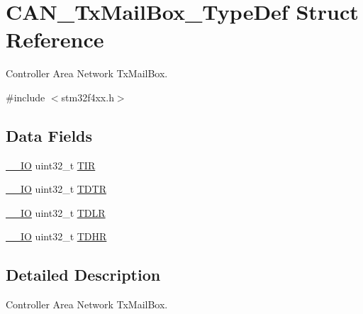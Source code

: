 \hypertarget{struct_c_a_n___tx_mail_box___type_def}{\section{C\-A\-N\-\_\-\-Tx\-Mail\-Box\-\_\-\-Type\-Def Struct Reference}
\label{struct_c_a_n___tx_mail_box___type_def}
}


Controller Area Network Tx\-Mail\-Box.  




{\ttfamily \#include $<$stm32f4xx.\-h$>$}

\subsection*{Data Fields}
\begin{DoxyCompactItemize}
\item 
\hyperlink{group___c_m_s_i_s__core__definitions_gaec43007d9998a0a0e01faede4133d6be}{\-\_\-\-\_\-\-I\-O} uint32\-\_\-t \hyperlink{struct_c_a_n___tx_mail_box___type_def_a6921aa1c578a7d17c6e0eb33a73b6630}{T\-I\-R}
\item 
\hyperlink{group___c_m_s_i_s__core__definitions_gaec43007d9998a0a0e01faede4133d6be}{\-\_\-\-\_\-\-I\-O} uint32\-\_\-t \hyperlink{struct_c_a_n___tx_mail_box___type_def_aed87bed042dd9523ce086119a3bab0ea}{T\-D\-T\-R}
\item 
\hyperlink{group___c_m_s_i_s__core__definitions_gaec43007d9998a0a0e01faede4133d6be}{\-\_\-\-\_\-\-I\-O} uint32\-\_\-t \hyperlink{struct_c_a_n___tx_mail_box___type_def_aded1359e1a32512910bff534d57ade68}{T\-D\-L\-R}
\item 
\hyperlink{group___c_m_s_i_s__core__definitions_gaec43007d9998a0a0e01faede4133d6be}{\-\_\-\-\_\-\-I\-O} uint32\-\_\-t \hyperlink{struct_c_a_n___tx_mail_box___type_def_a90f7c1cf22683459c632d6040366eddf}{T\-D\-H\-R}
\end{DoxyCompactItemize}


\subsection{Detailed Description}
Controller Area Network Tx\-Mail\-Box. 

